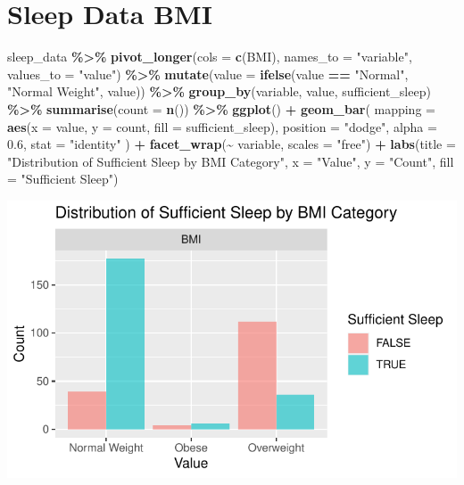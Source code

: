 \documentclass[
  11pt,
]{article}
\newenvironment{Shaded}{\begin{snugshade}}{\end{snugshade}}
\newcommand{\AttributeTok}[1]{\textcolor[rgb]{0.13,0.29,0.53}{#1}}
\newcommand{\FloatTok}[1]{\textcolor[rgb]{0.00,0.00,0.81}{#1}}
\newcommand{\FunctionTok}[1]{\textcolor[rgb]{0.13,0.29,0.53}{\textbf{#1}}}
\newcommand{\NormalTok}[1]{#1}
\newcommand{\SpecialCharTok}[1]{\textcolor[rgb]{0.81,0.36,0.00}{\textbf{#1}}}
\newcommand{\StringTok}[1]{\textcolor[rgb]{0.31,0.60,0.02}{#1}}
\begin{document}
\hypertarget{sleep-data-bmi}{%
\section{Sleep Data BMI}\label{sleep-data-bmi}}

\begin{Shaded}
\begin{Highlighting}[]
\NormalTok{sleep\_data }\SpecialCharTok{\%\textgreater{}\%}
  \FunctionTok{pivot\_longer}\NormalTok{(}\AttributeTok{cols =} \FunctionTok{c}\NormalTok{(BMI), }\AttributeTok{names\_to =} \StringTok{"variable"}\NormalTok{, }\AttributeTok{values\_to =} \StringTok{"value"}\NormalTok{) }\SpecialCharTok{\%\textgreater{}\%}
  \FunctionTok{mutate}\NormalTok{(}\AttributeTok{value =} \FunctionTok{ifelse}\NormalTok{(value }\SpecialCharTok{==} \StringTok{"Normal"}\NormalTok{, }\StringTok{"Normal Weight"}\NormalTok{, value)) }\SpecialCharTok{\%\textgreater{}\%}
  \FunctionTok{group\_by}\NormalTok{(variable, value, sufficient\_sleep) }\SpecialCharTok{\%\textgreater{}\%}
  \FunctionTok{summarise}\NormalTok{(}\AttributeTok{count =} \FunctionTok{n}\NormalTok{()) }\SpecialCharTok{\%\textgreater{}\%}
  \FunctionTok{ggplot}\NormalTok{() }\SpecialCharTok{+}
  \FunctionTok{geom\_bar}\NormalTok{(}
    \AttributeTok{mapping =} \FunctionTok{aes}\NormalTok{(}\AttributeTok{x =}\NormalTok{ value, }\AttributeTok{y =}\NormalTok{ count, }\AttributeTok{fill =}\NormalTok{ sufficient\_sleep),}
    \AttributeTok{position =} \StringTok{"dodge"}\NormalTok{,   }
    \AttributeTok{alpha =} \FloatTok{0.6}\NormalTok{,}
    \AttributeTok{stat =} \StringTok{"identity"}
\NormalTok{  ) }\SpecialCharTok{+}
  \FunctionTok{facet\_wrap}\NormalTok{(}\SpecialCharTok{\textasciitilde{}}\NormalTok{ variable, }\AttributeTok{scales =} \StringTok{"free"}\NormalTok{) }\SpecialCharTok{+}
  \FunctionTok{labs}\NormalTok{(}\AttributeTok{title =} \StringTok{"Distribution of Sufficient Sleep by BMI Category"}\NormalTok{,}
       \AttributeTok{x =} \StringTok{"Value"}\NormalTok{, }
       \AttributeTok{y =} \StringTok{"Count"}\NormalTok{, }
       \AttributeTok{fill =} \StringTok{"Sufficient Sleep"}\NormalTok{)}
\end{Highlighting}
\end{Shaded}

\begin{center}\includegraphics[width=0.7\linewidth]{SleepHelath_files/figure-latex/unnamed-chunk-37-1} \end{center}
\end{document}
